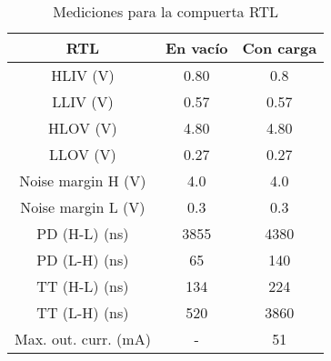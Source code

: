 \documentclass[../../e3_tp2_main.tex]{subfiles}
\begin{document}
\begin{table}[H]
	\centering
	\begin{tabular}{|c|c|c|}
	\hline
        \textbf{RTL}           	& En vac\'io	& Con carga \\ \hline \hline
	HLIV (V)                    & 0.80              	& 0.8           \\ \hline
	LLIV (V)                    	& 0.57               & 0.57         \\ \hline
	HLOV (V)                  	& 4.80               & 4.80         \\ \hline
	LLOV (V)                   	& 0.27               & 0.27                              \\ \hline
	Noise margin H (V)     & 4.0             	& 4.0                              \\ \hline
	Noise margin L (V)	& 0.3			& 0.3		\\ \hline
	PD (H-L) (ns)		& 3855              & 4380                        \\ \hline
	PD (L-H) (ns) 		& 65                 & 140             \\ \hline
	TT (H-L) (ns)   		& 134               & 224                   \\ \hline
	TT (L-H) (ns)   		& 520                & 3860                   \\ \hline
	Max. out. curr. (mA)   & -                    & 51                     \\ \hline

	\end{tabular}
	
	\caption{Mediciones para la compuerta RTL}
	\label{table:1-mediciones-rtl}
\end{table}
\end{document}

